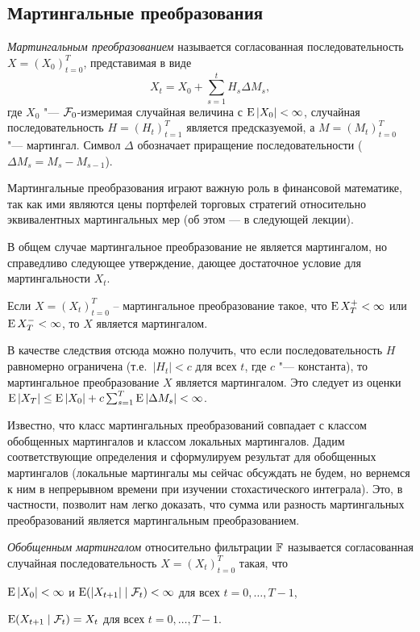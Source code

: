 \subsection{Мартингальные преобразования}
\begin{definition}
\emph{Мартингальным преобразованием} называется согласованная последовательность $X=(X_0)_{t=0}^T$, представимая в виде
\[
X_t = X_0 + \sum_{s=1}^t H_s \Delta M_s,
\]
где $X_0$ "--- $\mathcal{F}_0$-измеримая случайная величина с $\operatorname{E}|X_0|<\infty$, случайная последовательность $H=(H_t)_{t=1}^T$ является предсказуемой, а $M=(M_t)_{t=0}^T$ "--- мартингал. Символ $\Delta$ обозначает приращение последовательности (\te\ $\Delta M_s = M_s - M_{s-1}$).
\end{definition}

Мартингальные преобразования играют важную роль в финансовой математике, так как ими являются цены портфелей торговых стратегий относительно эквивалентных мартингальных мер (об этом --- в следующей лекции).

В общем случае мартингальное преобразование не является мартингалом, но справедливо следующее утверждение, дающее достаточное условие для мартингальности $X_t$.

\begin{proposition}
\label{mart:martingale-transform}
Если $X=(X_t)_{t=0}^T$ -- мартингальное преобразование такое, что $\operatorname{E} X_T^+ < \infty$ или $\operatorname{E} X_T^- < \infty$, то $X$ является мартингалом.
\end{proposition}

В качестве следствия отсюда можно получить, что если последовательность $H$ равномерно ограничена (т.е.\ $|H_t| < c$ для всех $t$, где $c$ "--- константа), то мартингальное преобразование $X$ является мартингалом.
Это следует из оценки $\operatorname{E} |X_T| \le \operatorname{E}|X_0| + c\sum_{s=1}^T \operatorname{E}|\Delta M_s| < \infty$.

\medskip
Известно, что класс мартингальных преобразований совпадает с классом обобщенных мартингалов и классом локальных мартингалов. Дадим соответствующие определения и сформулируем результат для обобщенных мартингалов (локальные мартингалы мы сейчас обсуждать не будем, но вернемся к ним в непрерывном времени при изучении стохастического интеграла).
Это, в частности, позволит нам легко доказать, что сумма или разность мартингальных преобразований является мартингальным преобразованием.

\begin{definition}
\emph{Обобщенным мартингалом} относительно фильтрации $\mathbb{F}$ называется согласованная случайная последовательность $X=(X_t)_{t=0}^T$ такая, что
\begin{alphenum}
\item $\operatorname{E}|X_0| < \infty$ и $\operatorname{E}(|X_{t+1}|\mid \mathcal{F}_t) < \infty$ для всех $t=0,\dots,T-1$,
\item $\operatorname{E}(X_{t+1}\mid \mathcal{F}_t) = X_t$ для всех $t=0,\dots,T-1$.
\end{alphenum}
\end{definition}

